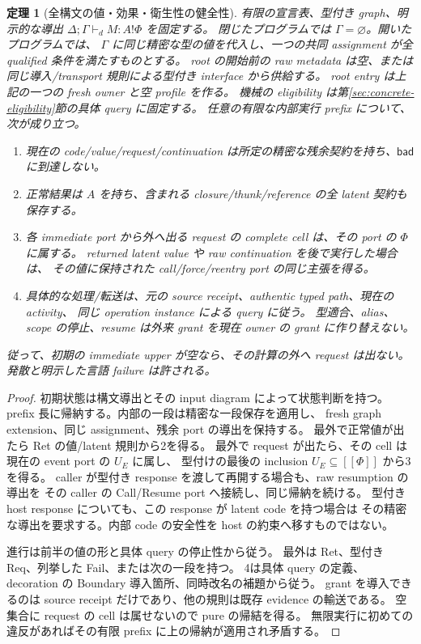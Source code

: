 \documentclass[11pt,a4paper]{article}
\newtheorem{theorem}[definition]{定理}
\newcommand{\Bad}{\mathsf{bad}}
\newcommand{\llbracket}{[\![}
\newcommand{\rrbracket}{]\!]}
\begin{document}
\begin{theorem}[全構文の値・効果・衛生性の健全性]
\label{thm:full-safety}
有限の宣言表、型付き graph、明示的な導出
\(\Delta;\Gamma\vdash_d M:A!\Phi\) を固定する。
閉じたプログラムでは \(\Gamma=\varnothing\)。開いたプログラムでは、
\(\Gamma\) に同じ精密な型の値を代入し、一つの共同 assignment が全 qualified 条件を満たすものとする。
root の開始前の raw metadata は空、または同じ導入/transport 規則による型付き interface から供給する。
root entry は上記の一つの fresh owner と空 profile を作る。
機械の eligibility は第\ref{sec:concrete-eligibility}節の具体 query に固定する。
任意の有限な内部実行 prefix について、次が成り立つ。
\begin{enumerate}
\item 現在の code/value/request/continuation は所定の精密な残余契約を持ち、\(\Bad\) に到達しない。
\item 正常結果は \(A\) を持ち、含まれる closure/thunk/reference の全 latent 契約も保存する。
\item 各 immediate port から外へ出る request の complete cell は、その port の \(\Phi\) に属する。
      returned latent value や raw continuation を後で実行した場合は、
      その値に保持された call/force/reentry port の同じ主張を得る。
\item 具体的な処理/転送は、元の source receipt、authentic typed path、現在の activity、
      同じ operation instance による query に従う。
      型適合、alias、scope の停止、resume は外来 grant を現在 owner の grant に作り替えない。
\end{enumerate}
従って、初期の immediate upper が空なら、その計算の外へ request は出ない。
発散と明示した言語 failure は許される。
\end{theorem}
\begin{proof}
初期状態は構文導出とその input diagram によって状態判断を持つ。
prefix 長に帰納する。内部の一段は精密な一段保存を適用し、
fresh graph extension、同じ assignment、残余 port の導出を保持する。
最外で正常値が出たら Ret の値/latent 規則から2を得る。
最外で request が出たら、その cell は現在の event port の \(U_E\) に属し、
型付けの最後の inclusion \(U_E\subseteq\llbracket\Phi\rrbracket\) から3を得る。
caller が型付き response を渡して再開する場合も、raw resumption の導出を
その caller の Call/Resume port へ接続し、同じ帰納を続ける。
型付き host response についても、この response が latent code を持つ場合は
その精密な導出を要求する。内部 code の安全性を host の約束へ移すものではない。

進行は前半の値の形と具体 query の停止性から従う。
最外は Ret、型付き Req、列挙した Fail、または次の一段を持つ。
4は具体 query の定義、decoration の Boundary 導入箇所、同時改名の補題から従う。
grant を導入できるのは source receipt だけであり、他の規則は既存 evidence の輸送である。
空集合に request の cell は属せないので pure の帰結を得る。
無限実行に初めての違反があればその有限 prefix に上の帰納が適用され矛盾する。
\end{proof}
\end{document}
